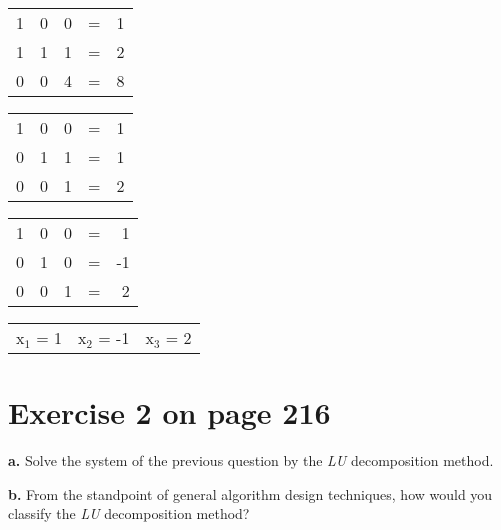 \documentclass[11pt]{article}
\begin{document}
\begin{center}
\begin{tabular}{rrrlr}
 1  &  0  &  0  &  =  &  1  \\
 1  &  1  &  1  &  =  &  2  \\
 0  &  0  &  4  &  =  &  8  \\
\end{tabular}
\end{center}





\begin{center}
\begin{tabular}{rrrlr}
 1  &  0  &  0  &  =  &  1  \\
 0  &  1  &  1  &  =  &  1  \\
 0  &  0  &  1  &  =  &  2  \\
\end{tabular}
\end{center}





\begin{center}
\begin{tabular}{rrrlr}
 1  &  0  &  0  &  =  &   1  \\
 0  &  1  &  0  &  =  &  -1  \\
 0  &  0  &  1  &  =  &   2  \\
\end{tabular}
\end{center}





\begin{center}
\begin{tabular}{lll}
 x$_1$ = 1  &  x$_2$ = -1  &  x$_3$ = 2  \\
\end{tabular}
\end{center}



\section*{Exercise 2 on page 216}
\label{sec-2}


\textbf{a.} Solve the system of the previous question by the \emph{LU} decomposition method.

\textbf{b.} From the standpoint of general algorithm design techniques, how would
     you classify the \emph{LU} decomposition method?
\end{document}
